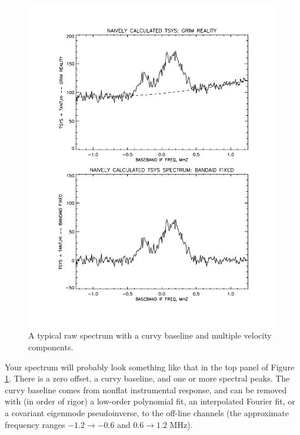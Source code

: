 \documentclass[11pt,preprint]{aastex}
\begin{document}
\begin{figure}[h!]
\begin{center}
%       
\includegraphics[scale=0.5]{bmp_cal1.pdf}
\end{center}
\vspace{-0.3in}
\caption{\footnotesize A typical raw spectrum with a curvy baseline and
  multiple velocity components. \label{rawspect}}
\end{figure}

Your spectrum will probably look something like that in the top panel of
Figure \ref{rawspect}. There is a zero offset, a curvy baseline, and
one or more spectral peaks. The curvy baseline comes from nonflat
instrumental response, and can be removed with (in order of rigor)
a low-order polynomial fit, an interpolated Fourier fit, or a
covariant eigenmode pseudoinverse, to the 
off-line channels (the approximate
frequency ranges $-1.2 \rightarrow -0.6$ and $ 0.6 \rightarrow 1.2$
MHz).
\end{document}
